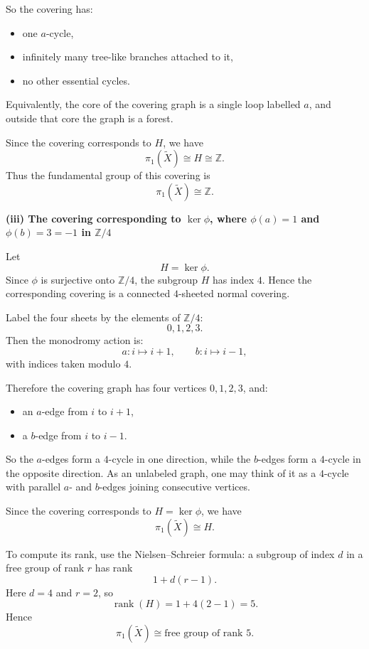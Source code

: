 \begin{solution}
So the covering has:
\begin{itemize}
	\item one \(a\)-cycle,
	\item infinitely many tree-like branches attached to it,
	\item no other essential cycles.
\end{itemize}

Equivalently, the core of the covering graph is a single loop labelled \(a\), and outside that core the graph is a forest.

Since the covering corresponds to \(H\), we have
\[
\pi_1(\widetilde X)\cong H\cong \mathbb Z.
\]
Thus the fundamental group of this covering is
\[
\pi_1(\widetilde X)\cong \mathbb Z.
\]


\medskip
\noindent\textbf{(iii) The covering corresponding to \texorpdfstring{$\ker\phi$}{ker phi}, where \texorpdfstring{$\phi(a)=1$}{phi(a)=1} and \texorpdfstring{$\phi(b)=3=-1$}{phi(b)=3=-1} in \texorpdfstring{$\mathbb Z/4$}{Z/4}}\par
\smallskip


Let
\[
H=\ker\phi.
\]
Since \(\phi\) is surjective onto \(\mathbb Z/4\), the subgroup \(H\) has index \(4\). Hence the corresponding covering is a connected \(4\)-sheeted normal covering.

Label the four sheets by the elements of \(\mathbb Z/4\):
\[
0,1,2,3.
\]
Then the monodromy action is:
\[
a:i\mapsto i+1,\qquad b:i\mapsto i-1,
\]
with indices taken modulo \(4\).

Therefore the covering graph has four vertices \(0,1,2,3\), and:
\begin{itemize}
	\item an \(a\)-edge from \(i\) to \(i+1\),
	\item a \(b\)-edge from \(i\) to \(i-1\).
\end{itemize}
So the \(a\)-edges form a \(4\)-cycle in one direction, while the \(b\)-edges form a \(4\)-cycle in the opposite direction. As an unlabeled graph, one may think of it as a \(4\)-cycle with parallel \(a\)- and \(b\)-edges joining consecutive vertices.

Since the covering corresponds to \(H=\ker\phi\), we have
\[
\pi_1(\widetilde X)\cong H.
\]

To compute its rank, use the Nielsen--Schreier formula: a subgroup of index \(d\) in a free group of rank \(r\) has rank
\[
1+d(r-1).
\]
Here \(d=4\) and \(r=2\), so
\[
\operatorname{rank}(H)=1+4(2-1)=5.
\]
Hence
\[
\pi_1(\widetilde X)\cong \text{free group of rank }5.
\]


\end{solution}
